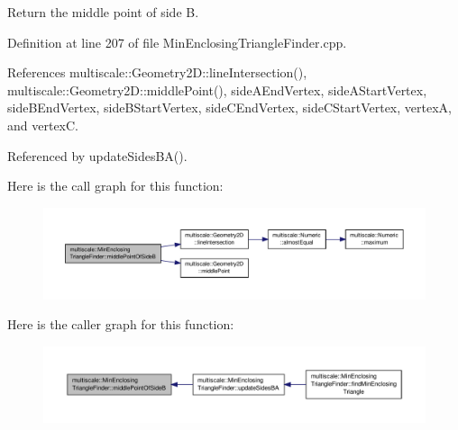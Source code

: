 Return the middle point of side B. 



Definition at line 207 of file Min\-Enclosing\-Triangle\-Finder.\-cpp.



References multiscale\-::\-Geometry2\-D\-::line\-Intersection(), multiscale\-::\-Geometry2\-D\-::middle\-Point(), side\-A\-End\-Vertex, side\-A\-Start\-Vertex, side\-B\-End\-Vertex, side\-B\-Start\-Vertex, side\-C\-End\-Vertex, side\-C\-Start\-Vertex, vertex\-A, and vertex\-C.



Referenced by update\-Sides\-B\-A().



Here is the call graph for this function\-:\nopagebreak
\begin{figure}[H]
\begin{center}
\leavevmode
\includegraphics[width=350pt]{classmultiscale_1_1MinEnclosingTriangleFinder_a664bee3e51e007b97fa21a92830f9066_cgraph}
\end{center}
\end{figure}




Here is the caller graph for this function\-:\nopagebreak
\begin{figure}[H]
\begin{center}
\leavevmode
\includegraphics[width=350pt]{classmultiscale_1_1MinEnclosingTriangleFinder_a664bee3e51e007b97fa21a92830f9066_icgraph}
\end{center}
\end{figure}


